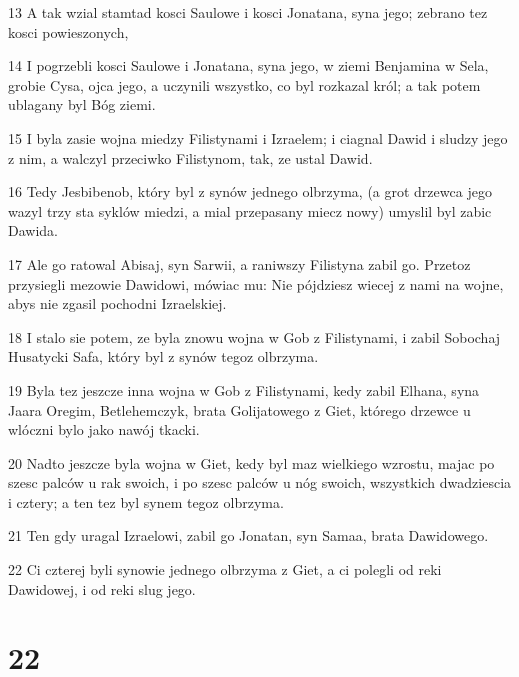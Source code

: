 \par 13 A tak wzial stamtad kosci Saulowe i kosci Jonatana, syna jego; zebrano tez kosci powieszonych,
\par 14 I pogrzebli kosci Saulowe i Jonatana, syna jego, w ziemi Benjamina w Sela, grobie Cysa, ojca jego, a uczynili wszystko, co byl rozkazal król; a tak potem ublagany byl Bóg ziemi.
\par 15 I byla zasie wojna miedzy Filistynami i Izraelem; i ciagnal Dawid i sludzy jego z nim, a walczyl przeciwko Filistynom, tak, ze ustal Dawid.
\par 16 Tedy Jesbibenob, który byl z synów jednego olbrzyma, (a grot drzewca jego wazyl trzy sta syklów miedzi, a mial przepasany miecz nowy) umyslil byl zabic Dawida.
\par 17 Ale go ratowal Abisaj, syn Sarwii, a raniwszy Filistyna zabil go. Przetoz przysiegli mezowie Dawidowi, mówiac mu: Nie pójdziesz wiecej z nami na wojne, abys nie zgasil pochodni Izraelskiej.
\par 18 I stalo sie potem, ze byla znowu wojna w Gob z Filistynami, i zabil Sobochaj Husatycki Safa, który byl z synów tegoz olbrzyma.
\par 19 Byla tez jeszcze inna wojna w Gob z Filistynami, kedy zabil Elhana, syna Jaara Oregim, Betlehemczyk, brata Golijatowego z Giet, którego drzewce u wlóczni bylo jako nawój tkacki.
\par 20 Nadto jeszcze byla wojna w Giet, kedy byl maz wielkiego wzrostu, majac po szesc palców u rak swoich, i po szesc palców u nóg swoich, wszystkich dwadziescia i cztery; a ten tez byl synem tegoz olbrzyma.
\par 21 Ten gdy uragal Izraelowi, zabil go Jonatan, syn Samaa, brata Dawidowego.
\par 22 Ci czterej byli synowie jednego olbrzyma z Giet, a ci polegli od reki Dawidowej, i od reki slug jego.

\chapter{22}

